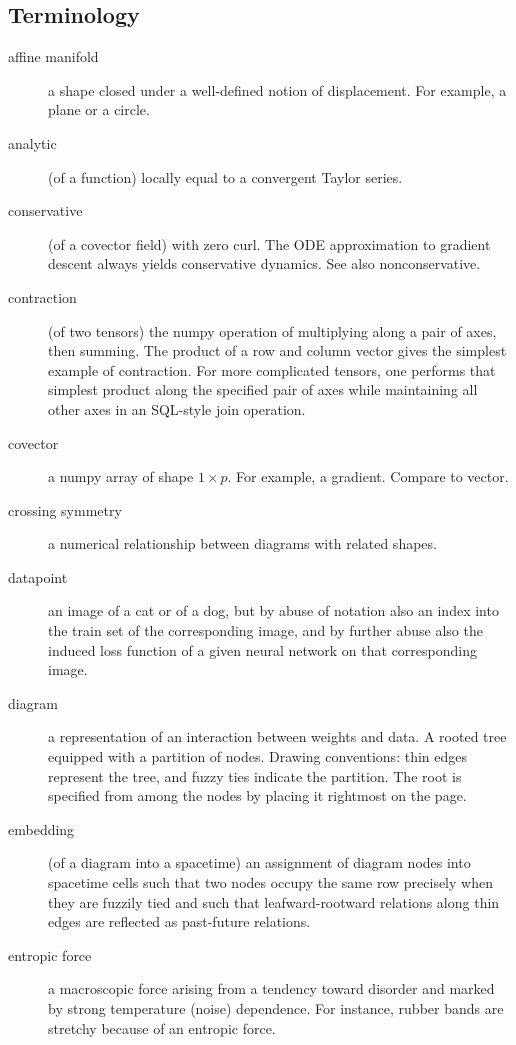 \documentclass{article}
\begin{document}
    \subsection{Terminology}

    \begin{description}
        \item[affine manifold] a shape closed under a well-defined notion of displacement.  For example, a plane or a circle.
        \item[analytic] (of a function) locally equal to a convergent Taylor series.  
        \item[conservative] (of a covector field) with zero curl.  The ODE approximation to gradient descent always yields conservative dynamics.  See also nonconservative. 
        \item[contraction] (of two tensors) the numpy operation of multiplying along a pair of axes, then summing.  The product of a row and column vector gives the simplest example of contraction.  For more complicated tensors, one performs that simplest product along the specified pair of axes while maintaining all other axes in an SQL-style join operation.  
        \item[covector] a numpy array of shape $1\times p$.  For example, a gradient.  Compare to vector.
        \item[crossing symmetry] a numerical relationship between diagrams with related shapes. 
        \item[datapoint] an image of a cat or of a dog, but by abuse of notation also an index into the train set of the corresponding image, and by further abuse also the induced loss function of a given neural network on that corresponding image.  
        \item[diagram] a representation of an interaction between weights and data.  A rooted tree equipped with a partition of nodes.  Drawing conventions: thin edges represent the tree, and fuzzy ties indicate the partition.  The root is specified from among the nodes by placing it rightmost on the page.
        \item[embedding] (of a diagram into a spacetime) an assignment of diagram nodes into spacetime cells such that two nodes occupy the same row precisely when they are fuzzily tied and such that leafward-rootward relations along thin edges are reflected as past-future relations.
        \item[entropic force] a macroscopic force arising from a tendency toward disorder and marked by strong temperature (noise) dependence.  For instance, rubber bands are stretchy because of an entropic force. 

\end{description}
\end{document}
